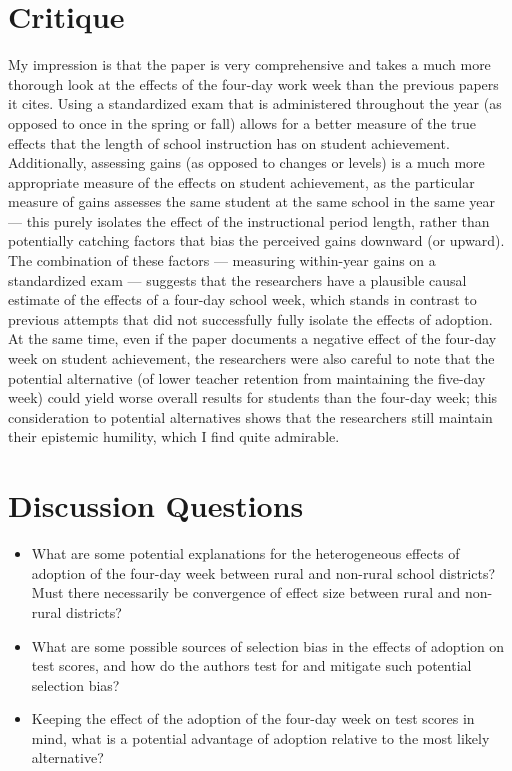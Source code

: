 \documentclass[10pt]{extarticle}
\begin{document}
  \section{Critique}%
  My impression is that the paper is very comprehensive and takes a much more thorough look at the effects of the four-day work week than the previous papers it cites. Using a standardized exam that is administered throughout the year (as opposed to once in the spring or fall) allows for a better measure of the true effects that the length of school instruction has on student achievement. Additionally, assessing gains (as opposed to changes or levels) is a much more appropriate measure of the effects on student achievement, as the particular measure of gains assesses the same student at the same school in the same year --- this purely isolates the effect of the instructional period length, rather than potentially catching factors that bias the perceived gains downward (or upward). The combination of these factors --- measuring within-year gains on a standardized exam --- suggests that the researchers have a plausible causal estimate of the effects of a four-day school week, which stands in contrast to previous attempts that did not successfully fully isolate the effects of adoption. At the same time, even if the paper documents a negative effect of the four-day week on student achievement, the researchers were also careful to note that the potential alternative (of lower teacher retention from maintaining the five-day week) could yield worse overall results for students than the four-day week; this consideration to potential alternatives shows that the researchers still maintain their epistemic humility, which I find quite admirable.
  \section{Discussion Questions}%
  \begin{itemize}
    \item What are some potential explanations for the heterogeneous effects of adoption of the four-day week between rural and non-rural school districts? Must there necessarily be convergence of effect size between rural and non-rural districts?
    \item What are some possible sources of selection bias in the effects of adoption on test scores, and how do the authors test for and mitigate such potential selection bias?
    \item Keeping the effect of the adoption of the four-day week on test scores in mind, what is a potential advantage of adoption relative to the most likely alternative?
  \end{itemize}
\end{document}
